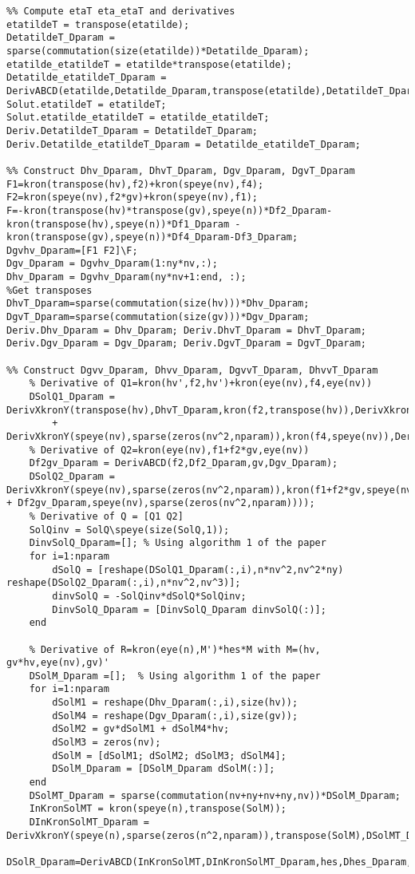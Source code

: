 \documentclass{article}
\begin{document}
\begin{verbatim}
%% Compute etaT eta_etaT and derivatives
etatildeT = transpose(etatilde);
DetatildeT_Dparam = sparse(commutation(size(etatilde))*Detatilde_Dparam);
etatilde_etatildeT = etatilde*transpose(etatilde);
Detatilde_etatildeT_Dparam = DerivABCD(etatilde,Detatilde_Dparam,transpose(etatilde),DetatildeT_Dparam);
Solut.etatildeT = etatildeT;
Solut.etatilde_etatildeT = etatilde_etatildeT;
Deriv.DetatildeT_Dparam = DetatildeT_Dparam;
Deriv.Detatilde_etatildeT_Dparam = Detatilde_etatildeT_Dparam;

%% Construct Dhv_Dparam, DhvT_Dparam, Dgv_Dparam, DgvT_Dparam
F1=kron(transpose(hv),f2)+kron(speye(nv),f4);
F2=kron(speye(nv),f2*gv)+kron(speye(nv),f1);
F=-kron(transpose(hv)*transpose(gv),speye(n))*Df2_Dparam-kron(transpose(hv),speye(n))*Df1_Dparam -kron(transpose(gv),speye(n))*Df4_Dparam-Df3_Dparam;
Dgvhv_Dparam=[F1 F2]\F;
Dgv_Dparam = Dgvhv_Dparam(1:ny*nv,:);
Dhv_Dparam = Dgvhv_Dparam(ny*nv+1:end, :);
%Get transposes
DhvT_Dparam=sparse(commutation(size(hv)))*Dhv_Dparam;
DgvT_Dparam=sparse(commutation(size(gv)))*Dgv_Dparam;
Deriv.Dhv_Dparam = Dhv_Dparam; Deriv.DhvT_Dparam = DhvT_Dparam;
Deriv.Dgv_Dparam = Dgv_Dparam; Deriv.DgvT_Dparam = DgvT_Dparam;

%% Construct Dgvv_Dparam, Dhvv_Dparam, DgvvT_Dparam, DhvvT_Dparam
    % Derivative of Q1=kron(hv',f2,hv')+kron(eye(nv),f4,eye(nv))
    DSolQ1_Dparam = DerivXkronY(transpose(hv),DhvT_Dparam,kron(f2,transpose(hv)),DerivXkronY(f2,Df2_Dparam,transpose(hv),DhvT_Dparam))...
        + DerivXkronY(speye(nv),sparse(zeros(nv^2,nparam)),kron(f4,speye(nv)),DerivXkronY(f4,Df4_Dparam,speye(nv),sparse(zeros(nv^2,nparam))));
    % Derivative of Q2=kron(eye(nv),f1+f2*gv,eye(nv))
    Df2gv_Dparam = DerivABCD(f2,Df2_Dparam,gv,Dgv_Dparam);
    DSolQ2_Dparam = DerivXkronY(speye(nv),sparse(zeros(nv^2,nparam)),kron(f1+f2*gv,speye(nv)),DerivXkronY(f1+f2*gv,Df1_Dparam + Df2gv_Dparam,speye(nv),sparse(zeros(nv^2,nparam))));
    % Derivative of Q = [Q1 Q2]
    SolQinv = SolQ\speye(size(SolQ,1));
    DinvSolQ_Dparam=[]; % Using algorithm 1 of the paper
    for i=1:nparam
        dSolQ = [reshape(DSolQ1_Dparam(:,i),n*nv^2,nv^2*ny) reshape(DSolQ2_Dparam(:,i),n*nv^2,nv^3)];
        dinvSolQ = -SolQinv*dSolQ*SolQinv;
        DinvSolQ_Dparam = [DinvSolQ_Dparam dinvSolQ(:)];
    end

    % Derivative of R=kron(eye(n),M')*hes*M with M=(hv, gv*hv,eye(nv),gv)'
    DSolM_Dparam =[];  % Using algorithm 1 of the paper
    for i=1:nparam
        dSolM1 = reshape(Dhv_Dparam(:,i),size(hv));
        dSolM4 = reshape(Dgv_Dparam(:,i),size(gv));
        dSolM2 = gv*dSolM1 + dSolM4*hv;
        dSolM3 = zeros(nv);
        dSolM = [dSolM1; dSolM2; dSolM3; dSolM4];
        DSolM_Dparam = [DSolM_Dparam dSolM(:)];
    end
    DSolMT_Dparam = sparse(commutation(nv+ny+nv+ny,nv))*DSolM_Dparam;
    InKronSolMT = kron(speye(n),transpose(SolM));
    DInKronSolMT_Dparam = DerivXkronY(speye(n),sparse(zeros(n^2,nparam)),transpose(SolM),DSolMT_Dparam);
    DSolR_Dparam=DerivABCD(InKronSolMT,DInKronSolMT_Dparam,hes,Dhes_Dparam,SolM,DSolM_Dparam);


\end{verbatim}
\end{document}
